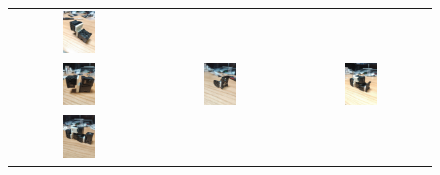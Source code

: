 \begin{figure}[H]
\begin{tabular}{ccc}
  \includegraphics[width=0.25\textwidth]{figs/appendix/dedo/6.jpg} \\
  \includegraphics[width=0.25\textwidth]{figs/appendix/dedo/7.jpg} &
  \includegraphics[width=0.25\textwidth]{figs/appendix/dedo/8.jpg} &
  \includegraphics[width=0.25\textwidth]{figs/appendix/dedo/9.jpg} \\
  \includegraphics[width=0.25\textwidth]{figs/appendix/dedo/10.jpg} &

\end{tabular}
\end{figure}
